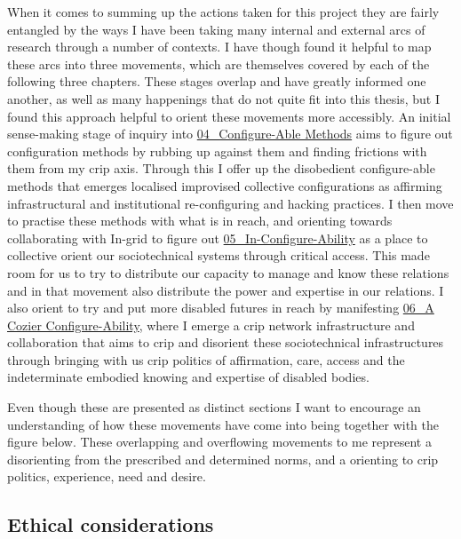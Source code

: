 When it comes to summing up the actions taken for this project they are
fairly entangled by the ways I have been taking many internal and
external arcs of research through a number of contexts. I have though
found it helpful to map these arcs into three movements, which are
themselves covered by each of the following three chapters. These stages
overlap and have greatly informed one another, as well as many
happenings that do not quite fit into this thesis, but I found this
approach helpful to orient these movements more accessibly. An initial
sense-making stage of inquiry into
\href{../../04_Configure-able_Methods/04_Configure-Able\%20Methods.md}{04\_Configure-Able
Methods} aims to figure out configuration methods by rubbing up against
them and finding frictions with them from my crip axis. Through this I
offer up the disobedient configure-able methods that emerges localised
improvised collective configurations as affirming infrastructural and
institutional re-configuring and hacking practices. I then move to
practise these methods with what is in reach, and orienting towards
collaborating with In-grid to figure out
\href{../../05_In-Configure-Ability/05_In-Configure-Ability.md}{05\_In-Configure-Ability}
as a place to collective orient our sociotechnical systems through
critical access. This made room for us to try to distribute our capacity
to manage and know these relations and in that movement also distribute
the power and expertise in our relations. I also orient to try and put
more disabled futures in reach by manifesting
\href{../../06_A\%20Cozier\%20Configure-Ability/06_A\%20Cozier\%20Configure-Ability.md}{06\_A
Cozier Configure-Ability}, where I emerge a crip network infrastructure
and collaboration that aims to crip and disorient these sociotechnical
infrastructures through bringing with us crip politics of affirmation,
care, access and the indeterminate embodied knowing and expertise of
disabled bodies.

Even though these are presented as distinct sections I want to encourage
an understanding of how these movements have come into being together
with the figure below. These overlapping and overflowing movements to me
represent a disorienting from the prescribed and determined norms, and a
orienting to crip politics, experience, need and desire.

\hypertarget{ethical-considerations}{%
\subsection{Ethical considerations}\label{ethical-considerations}}

